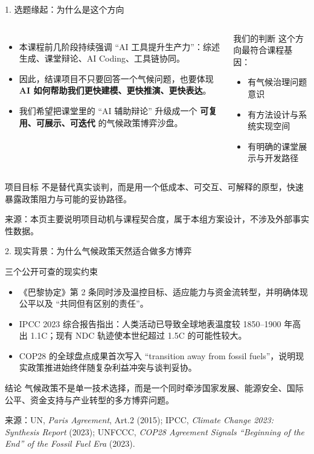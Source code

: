 \documentclass[aspectratio=169,10.5pt]{ctexbeamer}
\newcommand{\source}[1]{\vfill{\tiny\color{textgray}来源：#1}}
\begin{document}
\begin{frame}{1. 选题缘起：为什么是这个方向}
  \begin{columns}[T]
    \begin{itemize}
      \item 本课程前几阶段持续强调 ``AI 工具提升生产力''：综述生成、课堂辩论、AI Coding、工具链协同。
      \item 因此，结课项目不只要回答一个气候问题，也要体现 \textbf{AI 如何帮助我们更快建模、更快推演、更快表达}。
      \item 我们希望把课堂里的 ``AI 辅助辩论'' 升级成一个 \textbf{可复用、可展示、可迭代} 的气候政策博弈沙盘。
    \end{itemize}
    \begin{alertblock}{我们的判断}
      这个方向最符合课程基因：
      \begin{itemize}
        \item 有气候治理问题意识
        \item 有方法设计与系统实现空间
        \item 有明确的课堂展示与开发路径
      \end{itemize}
    \end{alertblock}
  \end{columns}
  \begin{block}{项目目标}
    不是替代真实谈判，而是用一个低成本、可交互、可解释的原型，快速暴露政策阻力与可能的妥协路径。
  \end{block}
  \source{本页主要说明项目动机与课程契合度，属于本组方案设计，不涉及外部事实性数据。}
\end{frame}

\begin{frame}{2. 现实背景：为什么气候政策天然适合做多方博弈}
  \begin{block}{三个公开可查的现实约束}
    \begin{itemize}
      \item 《巴黎协定》第 2 条同时涉及温控目标、适应能力与资金流转型，并明确体现公平以及 ``共同但有区别的责任''。
      \item IPCC 2023 综合报告指出：人类活动已导致全球地表温度较 1850--1900 年高出 1.1\textdegree C；现有 NDC 轨迹使本世纪超过 1.5\textdegree C 的可能性较大。
      \item COP28 的全球盘点成果首次写入 ``transition away from fossil fuels''，说明现实政策推进始终伴随复杂利益冲突与谈判妥协。
    \end{itemize}
  \end{block}
  \begin{alertblock}{结论}
    气候政策不是单一技术选择，而是一个同时牵涉国家发展、能源安全、国际公平、资金支持与产业转型的多方博弈问题。
  \end{alertblock}
  \source{UN, \emph{Paris Agreement}, Art.2 (2015); IPCC, \emph{Climate Change 2023: Synthesis Report} (2023); UNFCCC, \emph{COP28 Agreement Signals ``Beginning of the End'' of the Fossil Fuel Era} (2023).}
\end{frame}
\end{document}
